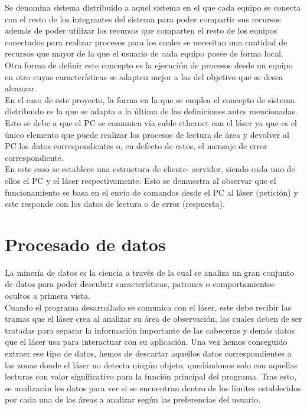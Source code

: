 Se denomina sistema distribuido a aquel sistema en el que cada equipo se conecta con el resto de los integrantes del sistema para poder compartir sus recursos además de poder utilizar los recursos que comparten el resto de los equipos conectados para realizar procesos para los cuales se necesitan una cantidad de recursos que mayor de la que el usuario de cada equipo posee de forma local. Otra forma de definir este concepto es la ejecución de procesos desde un equipo en otro cuyas características se adapten mejor a las del objetivo que se desea alcanzar.\\
En el caso de este proyecto, la forma en la que se emplea el concepto de sistema distribuido es la que se adapta a la última de las definiciones antes mencionadas. Esto se debe a que el PC se comunica vía cable ethernet con el láser ya que es el único elemento que puede realizar los procesos de lectura de área y devolver al PC los datos correspondientes o, en defecto de estos, el mensaje de error correspondiente.\\
En este caso se establece una estructura de cliente- servidor, siendo cada uno de ellos el PC y el láser respectivamente. Esto se demuestra al observar que el funcionamiento se basa en el envío de comandos desde el PC al láser (petición) y este responde con los datos de lectura o de error (respuesta).

\section{Procesado de datos}

La minería de datos es la ciencia a través de la cual se analiza un gran conjunto de datos para poder descubrir características, patrones o comportamientos ocultos a primera vista.\\
Cuando el programa desarrollado se comunica con el láser, este debe recibir las tramas que el láser crea al analizar su área de observación, las cuales deben de ser tratadas para separar la información importante de las cabeceras y demás datos que el láser usa para interactuar con su aplicación. Una vez hemos conseguido extraer ese tipo de datos, hemos de descartar aquellos datos correspondientes a las zonas donde el láser no detecta ningún objeto, quedándonos solo con aquellas lecturas con valor significativo para la función principal del programa. Tras esto, se analizarán los datos para ver si se encuentran dentro de los límites establecidos por cada una de las áreas a analizar según las preferencias del usuario.\\

